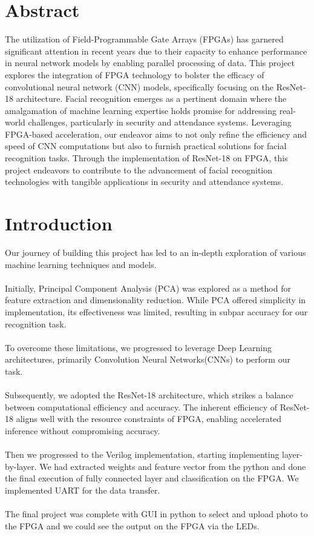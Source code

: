 \documentclass{article}
\begin{document}
\newpage
\section*{Abstract}
\large 
The utilization of Field-Programmable Gate Arrays (FPGAs) has garnered significant attention in recent years due to their capacity to enhance performance in neural network models by enabling parallel processing of data. This project explores the integration of FPGA technology to bolster the efficacy of convolutional neural network (CNN) models, specifically focusing on the ResNet-18 architecture. Facial recognition emerges as a pertinent domain where the amalgamation of machine learning expertise holds promise for addressing real-world challenges, particularly in security and attendance systems. Leveraging FPGA-based acceleration, our endeavor aims to not only refine the efficiency and speed of CNN computations but also to furnish practical solutions for facial recognition tasks. Through the implementation of ResNet-18 on FPGA, this project endeavors to contribute to the advancement of facial recognition technologies with tangible applications in security and attendance systems.
\newpage

{ \hypersetup{linkcolor=blue} \tableofcontents }

\newpage

\section{Introduction}
Our journey of building this project has led to an in-depth exploration of various machine learning techniques and models.
\\
\\Initially, Principal Component Analysis (PCA) was explored as a method for feature extraction and dimensionality reduction. While PCA offered simplicity in implementation, its effectiveness was limited, resulting in subpar accuracy for our recognition task.
\\
\\To overcome these limitations, we progressed to leverage Deep Learning architectures, primarily Convolution Neural Networks(CNNs) to perform our task.
\\
\\Subsequently, we adopted the ResNet-18 architecture, which strikes a balance between computational efficiency and accuracy. The inherent efficiency of ResNet-18 aligns well with the resource constraints of FPGA, enabling accelerated inference without compromising accuracy.
\\
\\Then we progressed to the Verilog implementation, starting implementing layer-by-layer. We had extracted weights and feature vector from the python and done the final execution of fully connected layer and classification on the FPGA. We implemented UART for the data transfer. 
\\
\\The final project was complete with GUI in python to select and upload photo to the FPGA and we could see the output on the FPGA via the LEDs.
\end{document}
